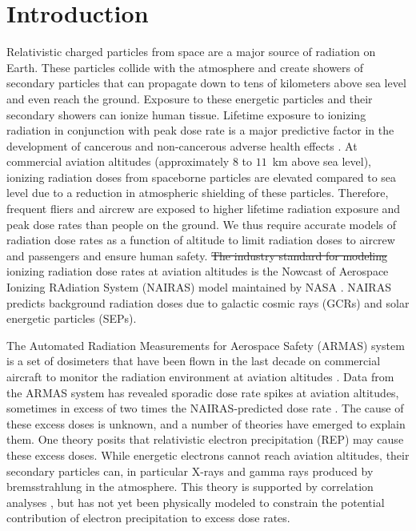 \documentclass[draft]{agujournal2019}
\providecommand{\DIFadd}[1]{{\protect\color{blue}\uwave{#1}}} %
\providecommand{\DIFdel}[1]{{\protect\color{red}\sout{#1}}}                      %
\providecommand{\DIFaddbegin}{} %
\providecommand{\DIFaddend}{} %
\providecommand{\DIFdelbegin}{} %
\providecommand{\DIFdelend}{} %
\newcommand{\DIFscaledelfig}{0.5}
\newlength{\DIFdelgraphicswidth} %
\newlength{\DIFdelgraphicsheight} %
\newcommand{\DIFaddincludegraphics}[2][]{{\color{blue}\fbox{\DIFOincludegraphics[#1]{#2}}}} %
\newcommand{\DIFdelincludegraphics}[2][]{%
\sbox{\DIFdelgraphicsbox}{\DIFOincludegraphics[#1]{#2}}%
\settoboxwidth{\DIFdelgraphicswidth}{\DIFdelgraphicsbox} %
\settoboxtotalheight{\DIFdelgraphicsheight}{\DIFdelgraphicsbox} %
\scalebox{\DIFscaledelfig}{%
\parbox[b]{\DIFdelgraphicswidth}{\usebox{\DIFdelgraphicsbox}\\[-\baselineskip] \rule{\DIFdelgraphicswidth}{0em}}\llap{\resizebox{\DIFdelgraphicswidth}{\DIFdelgraphicsheight}{%
\setlength{\unitlength}{\DIFdelgraphicswidth}%
\begin{picture}(1,1)%
\thicklines\linethickness{2pt} %
{\color[rgb]{1,0,0}\put(0,0){\framebox(1,1){}}}%
{\color[rgb]{1,0,0}\put(0,0){\line( 1,1){1}}}%
{\color[rgb]{1,0,0}\put(0,1){\line(1,-1){1}}}%
\end{picture}%
}\hspace*{3pt}}} %
} %
\DeclareRobustCommand{\DIFaddbegin}{\DIFOaddbegin \let\includegraphics\DIFaddincludegraphics} %
\DeclareRobustCommand{\DIFaddend}{\DIFOaddend \let\includegraphics\DIFOincludegraphics} %
\DeclareRobustCommand{\DIFdelbegin}{\DIFOdelbegin \let\includegraphics\DIFdelincludegraphics} %
\DeclareRobustCommand{\DIFdelend}{\DIFOaddend \let\includegraphics\DIFOincludegraphics} %
\begin{document}
\section{Introduction}
Relativistic charged particles from space are a major source of radiation on Earth. These particles collide with the atmosphere and create showers of secondary particles that can propagate down to tens of kilometers above sea level and even reach the ground. Exposure to these energetic particles and their secondary showers can ionize human tissue. Lifetime exposure to ionizing radiation in conjunction with peak dose rate is a major predictive factor in the development of cancerous and non-cancerous adverse health effects \cite{lowe2022, shah2014}. At commercial aviation altitudes (approximately $8$ to $11$~km above sea level), ionizing radiation doses from spaceborne particles are elevated compared to sea level due to a reduction in atmospheric shielding of these particles. Therefore, frequent fliers and aircrew are exposed to higher lifetime radiation exposure and peak dose rates than people on the ground. We thus require accurate models of radiation dose rates as a function of altitude to limit radiation doses to aircrew and passengers and ensure human safety. \DIFdelbegin \DIFdel{The industry standard for modeling }\DIFdelend \DIFaddbegin \DIFadd{One such model of }\DIFaddend ionizing radiation dose rates at aviation altitudes is the Nowcast of Aerospace Ionizing RAdiation System (NAIRAS) model maintained by NASA \cite{mertens2013}. NAIRAS predicts background radiation doses due to galactic cosmic rays (GCRs) and solar energetic particles (SEPs).

The Automated Radiation Measurements for Aerospace Safety (ARMAS) system is a set of dosimeters that have been flown in the last decade on commercial aircraft to monitor the radiation environment at aviation altitudes \cite{tobiska2016}. Data from the ARMAS system has revealed sporadic dose rate spikes at aviation altitudes, sometimes in excess of two times the NAIRAS-predicted dose rate \cite{tobiska2016, tobiska2018}. The cause of these excess doses is unknown, and a number of theories have emerged to explain them. One theory posits that relativistic electron precipitation (REP) may cause these excess doses. While energetic electrons cannot reach aviation altitudes, their secondary particles can, in particular X-rays and gamma rays produced by bremsstrahlung in the atmosphere. This theory is supported by correlation analyses \cite{aryan2023, aryan2025a, aryan2025b}, but has not yet been physically modeled to constrain the potential contribution of electron precipitation to excess dose rates.
\end{document}
